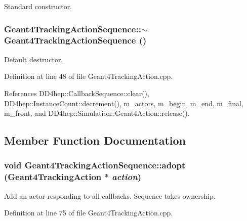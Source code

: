 Standard constructor. \hypertarget{class_d_d4hep_1_1_simulation_1_1_geant4_tracking_action_sequence_afa29770b5c1d47910c23dc3855244bcf}{
\subsubsection[{$\sim$Geant4TrackingActionSequence}]{\setlength{\rightskip}{0pt plus 5cm}Geant4TrackingActionSequence::$\sim$Geant4TrackingActionSequence ()}}
\label{class_d_d4hep_1_1_simulation_1_1_geant4_tracking_action_sequence_afa29770b5c1d47910c23dc3855244bcf}


Default destructor. 

Definition at line 48 of file Geant4TrackingAction.cpp.

References DD4hep::CallbackSequence::clear(), DD4hep::InstanceCount::decrement(), m\_\-actors, m\_\-begin, m\_\-end, m\_\-final, m\_\-front, and DD4hep::Simulation::Geant4Action::release().

\subsection{Member Function Documentation}
\hypertarget{class_d_d4hep_1_1_simulation_1_1_geant4_tracking_action_sequence_a6de81eaad737a180e602a8a826bfa06e}{
\subsubsection[{adopt}]{\setlength{\rightskip}{0pt plus 5cm}void Geant4TrackingActionSequence::adopt ({\bf Geant4TrackingAction} $\ast$ {\em action})}}
\label{class_d_d4hep_1_1_simulation_1_1_geant4_tracking_action_sequence_a6de81eaad737a180e602a8a826bfa06e}


Add an actor responding to all callbacks. Sequence takes ownership. 

Definition at line 75 of file Geant4TrackingAction.cpp.

